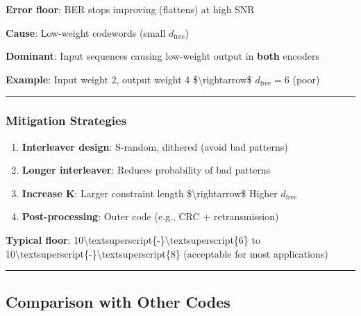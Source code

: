 \textbf{Error floor}: BER stops improving (flattens) at high SNR

\textbf{Cause}: Low-weight codewords (small \(d_{\text{free}}\))

\textbf{Dominant}: Input sequences causing low-weight output in
\textbf{both} encoders

\textbf{Example}: Input weight 2, output weight 4
\$\textbackslash rightarrow\$ \(d_{\text{free}} = 6\) (poor)

\begin{center}\rule{0.5\linewidth}{0.5pt}\end{center}

\subsubsection{Mitigation Strategies}\label{mitigation-strategies}

\begin{enumerate}
\def\labelenumi{\arabic{enumi}.}
\item
  \textbf{Interleaver design}: S-random, dithered (avoid bad patterns)
\item
  \textbf{Longer interleaver}: Reduces probability of bad patterns
\item
  \textbf{Increase K}: Larger constraint length
  \$\textbackslash rightarrow\$ Higher \(d_{\text{free}}\)
\item
  \textbf{Post-processing}: Outer code (e.g., CRC + retransmission)
\end{enumerate}

\textbf{Typical floor}:
10\textbackslash textsuperscript\{-\}\textbackslash textsuperscript\{6\}
to
10\textbackslash textsuperscript\{-\}\textbackslash textsuperscript\{8\}
(acceptable for most applications)

\begin{center}\rule{0.5\linewidth}{0.5pt}\end{center}

\subsection{Comparison with Other
Codes}\label{comparison-with-other-codes}

